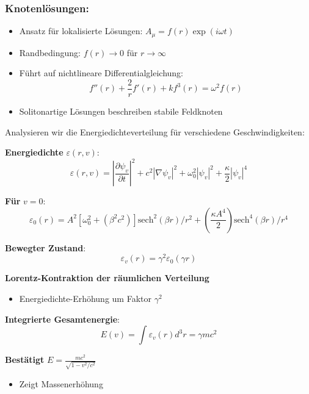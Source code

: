 \documentclass[12pt,a4paper]{article}
\begin{document}
	\subsubsection{Knotenlösungen:}
	
	\begin{itemize}
		\item Ansatz für lokalisierte Lösungen: $A_{\mu} = f(r)\exp(i\omega t)$
		\item Randbedingung: $f(r) \to 0$ für $r \to \infty$
		\item Führt auf nichtlineare Differentialgleichung:
		\begin{equation}
			f''(r) + \frac{2}{r}f'(r) + kf^3(r) = \omega^2f(r)
		\end{equation}
		\item Solitonartige Lösungen beschreiben stabile Feldknoten
	\end{itemize}
	
	
	
	
	Analysieren wir die Energiedichteverteilung für verschiedene Geschwindigkeiten:
	
	\textbf{Energiedichte} $\varepsilon(r,v)$:
	\begin{equation}
		\varepsilon(r,v) = \left|\frac{\partial \psi_v}{\partial t}\right|^2 + c^2|\nabla \psi_v|^2 + \omega_0^2|\psi_v|^2 + \frac{\kappa}{2}|\psi_v|^4
	\end{equation}
	
	\textbf{Für} $v = 0$:
	\begin{equation}
		\varepsilon_0(r) = A^2[\omega_0^2 + (\beta^2c^2)]\text{sech}^2(\beta r)/r^2 + \left(\frac{\kappa A^4}{2}\right)\text{sech}^4(\beta r)/r^4
	\end{equation}
	
	\textbf{Bewegter Zustand}:
	\begin{equation}
		\varepsilon_v(r) = \gamma^2\varepsilon_0(\gamma r)
	\end{equation}
	
	\textbf{Lorentz-Kontraktion der räumlichen Verteilung}
	\begin{itemize}
		\item Energiedichte-Erhöhung um Faktor $\gamma^2$
	\end{itemize}
	
	\textbf{Integrierte Gesamtenergie}:
	\begin{equation}
		E(v) = \int \varepsilon_v(r) d^3r = \gamma mc^2
	\end{equation}
	
	\textbf{Bestätigt} $E = \frac{mc^2}{\sqrt{1-v^2/c^2}}$
	\begin{itemize}
		\item Zeigt Massenerhöhung
	\end{itemize}
	
\end{document}
